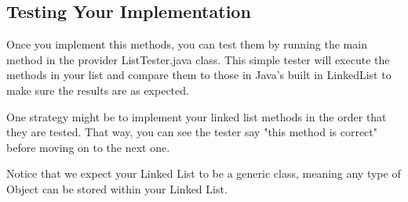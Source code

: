 \documentclass[paper=a4, fontsize=11pt, parskip=full]{scrartcl} %
\numberwithin{equation}{section} %
\numberwithin{figure}{section} %
\numberwithin{table}{section} %
\begin{document}
\subsection{Testing Your Implementation}

Once you implement this methods, you can test them by running the main method in the provider ListTester.java class. This simple tester will execute the methods in your list and compare them to those in Java's built in LinkedList to make sure the results are as expected.

One strategy might be to implement your linked list methods in the order that they are tested. That way, you can see the tester say "this method is correct" before moving on to the next one.

Notice that we expect your Linked List to be a generic class, meaning any type of Object can be stored within your Linked List.





\end{document}
